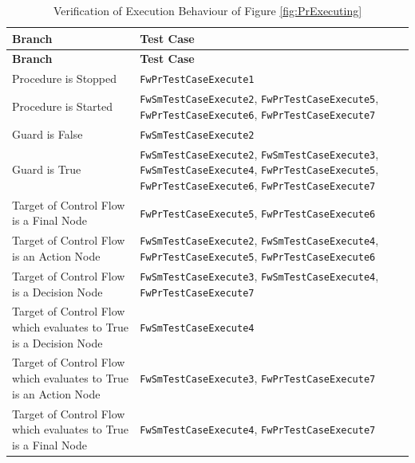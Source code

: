 \documentclass[a4paper,10pt]{article}
\begin{document}
\begin{longtable}{|p{6.7cm}|p{4.5cm}|}
\caption{Verification of Execution Behaviour of Figure \ref{fig:PrExecuting}}
\label{tab:PR_Exec} \\
\hline
\rowcolor{gray}
\textbf{Branch} & \textbf{Test Case} \\
\hline
\endfirsthead
\rowcolor{gray}
\textbf{Branch} & \textbf{Test Case} \\
\hline
\endhead
Procedure is Stopped & \texttt{FwPrTestCaseExecute1} \\
\hline
Procedure is Started & \texttt{FwSmTestCaseExecute2}, \texttt{FwPrTestCaseExecute5}, \texttt{FwPrTestCaseExecute6}, \texttt{FwPrTestCaseExecute7} \\
\hline
Guard is False & \texttt{FwSmTestCaseExecute2} \\
\hline
Guard is True & \texttt{FwSmTestCaseExecute2}, \texttt{FwSmTestCaseExecute3}, \texttt{FwSmTestCaseExecute4}, \texttt{FwPrTestCaseExecute5},
\texttt{FwPrTestCaseExecute6}, \texttt{FwPrTestCaseExecute7} \\
\hline
Target of Control Flow is a Final Node & \texttt{FwPrTestCaseExecute5}, \texttt{FwPrTestCaseExecute6} \\
\hline
Target of Control Flow is an Action Node & \texttt{FwSmTestCaseExecute2}, \texttt{FwSmTestCaseExecute4}, \texttt{FwPrTestCaseExecute5}, 
\texttt{FwPrTestCaseExecute6} \\
\hline
Target of Control Flow is a Decision Node & \texttt{FwSmTestCaseExecute3}, \texttt{FwSmTestCaseExecute4}, \texttt{FwPrTestCaseExecute7} \\
\hline
Target of Control Flow which evaluates to True is a Decision Node & \texttt{FwSmTestCaseExecute4} \\
\hline
Target of Control Flow which evaluates to True is an Action Node & \texttt{FwSmTestCaseExecute3}, \texttt{FwPrTestCaseExecute7} \\
\hline
Target of Control Flow which evaluates to True is a Final Node &  \texttt{FwSmTestCaseExecute4}, \texttt{FwPrTestCaseExecute7} \\
\hline
\end{longtable}


\end{document}
